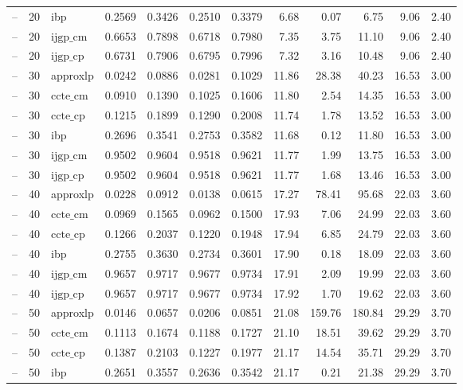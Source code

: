 \begin{table}[ht]
\begin{tabular}{lrlrrrrrrrrr}
-- & 20 & ibp & 0.2569 & 0.3426 & 0.2510 & 0.3379 & 6.68 & 0.07 & 6.75 & 9.06 & 2.40 \\
-- & 20 & $\text{ijgp\_cm}$ & 0.6653 & 0.7898 & 0.6718 & 0.7980 & 7.35 & 3.75 & 11.10 & 9.06 & 2.40 \\
-- & 20 & $\text{ijgp\_cp}$ & 0.6731 & 0.7906 & 0.6795 & 0.7996 & 7.32 & 3.16 & 10.48 & 9.06 & 2.40 \\
-- & 30 & approxlp & 0.0242 & 0.0886 & 0.0281 & 0.1029 & 11.86 & 28.38 & 40.23 & 16.53 & 3.00 \\
-- & 30 & $\text{ccte\_cm}$ & 0.0910 & 0.1390 & 0.1025 & 0.1606 & 11.80 & 2.54 & 14.35 & 16.53 & 3.00 \\
-- & 30 & $\text{ccte\_cp}$ & 0.1215 & 0.1899 & 0.1290 & 0.2008 & 11.74 & 1.78 & 13.52 & 16.53 & 3.00 \\
-- & 30 & ibp & 0.2696 & 0.3541 & 0.2753 & 0.3582 & 11.68 & 0.12 & 11.80 & 16.53 & 3.00 \\
-- & 30 & $\text{ijgp\_cm}$ & 0.9502 & 0.9604 & 0.9518 & 0.9621 & 11.77 & 1.99 & 13.75 & 16.53 & 3.00 \\
-- & 30 & $\text{ijgp\_cp}$ & 0.9502 & 0.9604 & 0.9518 & 0.9621 & 11.77 & 1.68 & 13.46 & 16.53 & 3.00 \\
-- & 40 & approxlp & 0.0228 & 0.0912 & 0.0138 & 0.0615 & 17.27 & 78.41 & 95.68 & 22.03 & 3.60 \\
-- & 40 & $\text{ccte\_cm}$ & 0.0969 & 0.1565 & 0.0962 & 0.1500 & 17.93 & 7.06 & 24.99 & 22.03 & 3.60 \\
-- & 40 & $\text{ccte\_cp}$ & 0.1266 & 0.2037 & 0.1220 & 0.1948 & 17.94 & 6.85 & 24.79 & 22.03 & 3.60 \\
-- & 40 & ibp & 0.2755 & 0.3630 & 0.2734 & 0.3601 & 17.90 & 0.18 & 18.09 & 22.03 & 3.60 \\
-- & 40 & $\text{ijgp\_cm}$ & 0.9657 & 0.9717 & 0.9677 & 0.9734 & 17.91 & 2.09 & 19.99 & 22.03 & 3.60 \\
-- & 40 & $\text{ijgp\_cp}$ & 0.9657 & 0.9717 & 0.9677 & 0.9734 & 17.92 & 1.70 & 19.62 & 22.03 & 3.60 \\
-- & 50 & approxlp & 0.0146 & 0.0657 & 0.0206 & 0.0851 & 21.08 & 159.76 & 180.84 & 29.29 & 3.70 \\
-- & 50 & $\text{ccte\_cm}$ & 0.1113 & 0.1674 & 0.1188 & 0.1727 & 21.10 & 18.51 & 39.62 & 29.29 & 3.70 \\
-- & 50 & $\text{ccte\_cp}$ & 0.1387 & 0.2103 & 0.1227 & 0.1977 & 21.17 & 14.54 & 35.71 & 29.29 & 3.70 \\
-- & 50 & ibp & 0.2651 & 0.3557 & 0.2636 & 0.3542 & 21.17 & 0.21 & 21.38 & 29.29 & 3.70 \\

\end{tabular}
\end{table}
